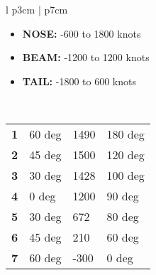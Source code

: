 \documentclass[8pt,usenames,dvipsnames,twoside]{article}
\begin{document}
\begin{center}
\begin{longtable}{l p{3cm} | p{7cm}}
				\begin{minipage}[t]{\linewidth}
					\vspace{-7pt}
					\begin{itemize}
						\item \textbf{NOSE:} -600 to 1800 knots
						\item \textbf{BEAM:} -1200 to 1200 knots
						\item \textbf{TAIL:} -1800 to 600 knots
					\end{itemize}
				\end{minipage} \\
				\bottomrule
			\end{longtable}
		\end{center}
		\begin{center}
		\end{center}
		\begin{center}
			\begin{longtable}{l | l | l | l}
				\toprule
				& \blue{Look Angle} & \blue{Line of Sight Rate} & \blue{Target Heading} \\
				\midrule
				\textbf{1} & 60 deg & 1490 & 180 deg \\
				\midrule
				\textbf{2} & 45 deg & 1500 & 120 deg \\
				\midrule
				\textbf{3} & 30 deg & 1428 & 100 deg \\
				\midrule
				\textbf{4} & 0 deg & 1200 & 90 deg \\
				\midrule
				\textbf{5} & 30 deg & 672 & 80 deg \\
				\midrule
				\textbf{6} & 45 deg & 210 & 60 deg \\
				\midrule
				\textbf{7} & 60 deg & -300 & 0 deg \\
				\bottomrule
			\end{longtable}
		\end{center}
	
		\clearpage
	
		
\end{document}
